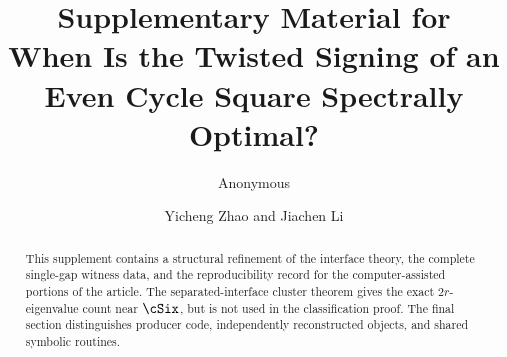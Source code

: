 \title{Supplementary Material for\\
When Is the Twisted Signing of an Even Cycle Square Spectrally Optimal?}
\ifdefined\TargetAAnonymous
  \author{Anonymous}
\else
  \author{Yicheng Zhao and Jiachen Li}
\fi
\date{}
\maketitle

\begin{abstract}
This supplement contains a structural refinement of the interface theory,
the complete single-gap witness data, and the reproducibility record for the
computer-assisted portions of the article. The separated-interface cluster
theorem gives the exact \(2r\)-eigenvalue count near \(\cSix\), but is not
used in the classification proof. The final section distinguishes producer
code, independently reconstructed objects, and shared symbolic routines.
\end{abstract}

\tableofcontents
\clearpage
